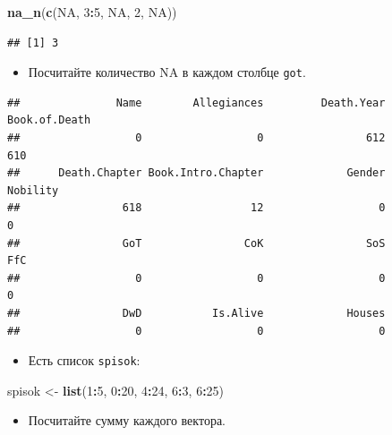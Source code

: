 \documentclass[]{book}
\newenvironment{Shaded}{\begin{snugshade}}{\end{snugshade}}
\newcommand{\KeywordTok}[1]{\textcolor[rgb]{0.13,0.29,0.53}{\textbf{#1}}}
\newcommand{\DecValTok}[1]{\textcolor[rgb]{0.00,0.00,0.81}{#1}}
\newcommand{\StringTok}[1]{\textcolor[rgb]{0.31,0.60,0.02}{#1}}
\newcommand{\OtherTok}[1]{\textcolor[rgb]{0.56,0.35,0.01}{#1}}
\newcommand{\OperatorTok}[1]{\textcolor[rgb]{0.81,0.36,0.00}{\textbf{#1}}}
\newcommand{\NormalTok}[1]{#1}
\providecommand{\tightlist}{%
  \setlength{\itemsep}{0pt}\setlength{\parskip}{0pt}}
\begin{document}
\begin{Shaded}
\begin{Highlighting}[]
\KeywordTok{na_n}\NormalTok{(}\KeywordTok{c}\NormalTok{(}\OtherTok{NA}\NormalTok{, }\DecValTok{3}\OperatorTok{:}\DecValTok{5}\NormalTok{, }\OtherTok{NA}\NormalTok{, }\DecValTok{2}\NormalTok{, }\OtherTok{NA}\NormalTok{))}
\end{Highlighting}
\end{Shaded}

\begin{verbatim}
## [1] 3
\end{verbatim}

\begin{itemize}
\tightlist
\item
  Посчитайте количество NA в каждом столбце \texttt{got}.
\end{itemize}

\begin{verbatim}
##               Name        Allegiances         Death.Year      Book.of.Death 
##                  0                  0                612                610 
##      Death.Chapter Book.Intro.Chapter             Gender           Nobility 
##                618                 12                  0                  0 
##                GoT                CoK                SoS                FfC 
##                  0                  0                  0                  0 
##                DwD           Is.Alive             Houses 
##                  0                  0                  0
\end{verbatim}

\begin{itemize}
\tightlist
\item
  Есть список \texttt{spisok}:
\end{itemize}

\begin{Shaded}
\begin{Highlighting}[]
\NormalTok{spisok <-}\StringTok{ }\KeywordTok{list}\NormalTok{(}\DecValTok{1}\OperatorTok{:}\DecValTok{5}\NormalTok{, }\DecValTok{0}\OperatorTok{:}\DecValTok{20}\NormalTok{, }\DecValTok{4}\OperatorTok{:}\DecValTok{24}\NormalTok{, }\DecValTok{6}\OperatorTok{:}\DecValTok{3}\NormalTok{, }\DecValTok{6}\OperatorTok{:}\DecValTok{25}\NormalTok{)}
\end{Highlighting}
\end{Shaded}

\begin{itemize}
\tightlist
\item
  Посчитайте сумму каждого вектора.
\end{itemize}
\end{document}
